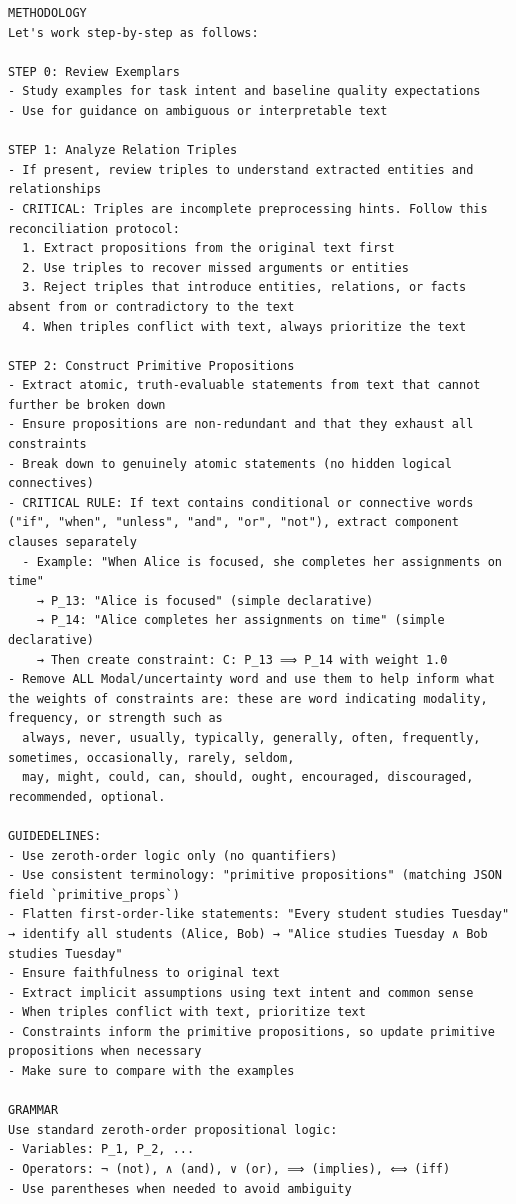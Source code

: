 \documentclass{article} %
\begin{document}
\begin{verbatim}
METHODOLOGY
Let's work step-by-step as follows:

STEP 0: Review Exemplars
- Study examples for task intent and baseline quality expectations
- Use for guidance on ambiguous or interpretable text

STEP 1: Analyze Relation Triples
- If present, review triples to understand extracted entities and relationships
- CRITICAL: Triples are incomplete preprocessing hints. Follow this reconciliation protocol:
  1. Extract propositions from the original text first
  2. Use triples to recover missed arguments or entities
  3. Reject triples that introduce entities, relations, or facts absent from or contradictory to the text
  4. When triples conflict with text, always prioritize the text

STEP 2: Construct Primitive Propositions
- Extract atomic, truth-evaluable statements from text that cannot further be broken down
- Ensure propositions are non-redundant and that they exhaust all constraints
- Break down to genuinely atomic statements (no hidden logical connectives)
- CRITICAL RULE: If text contains conditional or connective words ("if", "when", "unless", "and", "or", "not"), extract component clauses separately
  - Example: "When Alice is focused, she completes her assignments on time"
    → P_13: "Alice is focused" (simple declarative)
    → P_14: "Alice completes her assignments on time" (simple declarative)
    → Then create constraint: C: P_13 ⟹ P_14 with weight 1.0
- Remove ALL Modal/uncertainty word and use them to help inform what the weights of constraints are: these are word indicating modality, frequency, or strength such as
  always, never, usually, typically, generally, often, frequently, sometimes, occasionally, rarely, seldom,
  may, might, could, can, should, ought, encouraged, discouraged, recommended, optional. 

GUIDEDELINES:
- Use zeroth-order logic only (no quantifiers)
- Use consistent terminology: "primitive propositions" (matching JSON field `primitive_props`)
- Flatten first-order-like statements: "Every student studies Tuesday" → identify all students (Alice, Bob) → "Alice studies Tuesday ∧ Bob studies Tuesday"
- Ensure faithfulness to original text
- Extract implicit assumptions using text intent and common sense
- When triples conflict with text, prioritize text
- Constraints inform the primitive propositions, so update primitive propositions when necessary
- Make sure to compare with the examples

GRAMMAR
Use standard zeroth-order propositional logic:
- Variables: P_1, P_2, ...
- Operators: ¬ (not), ∧ (and), ∨ (or), ⟹ (implies), ⟺ (iff)
- Use parentheses when needed to avoid ambiguity


\end{verbatim}
\end{document}
